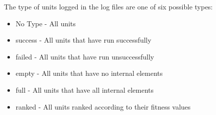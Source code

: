 The type of units logged in the log files are one of six possible types:

\begin{itemize}
	\item No Type - All units
	\item success - All units that have run successfully
	\item failed - All units that have run unsuccessfully
	\item empty - All units that have no internal elements
	\item full - All units that have all internal elements
	\item ranked - All units ranked according to their fitness values
\end{itemize}